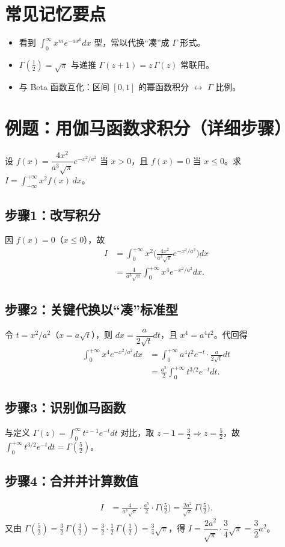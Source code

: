 \documentclass[UTF8,a4paper,12pt]{ctexart}
\numberwithin{equation}{section}
\begin{document}
\section{常见记忆要点}
\begin{itemize}
  \item 看到 \(\int_0^{\infty} x^m e^{-a x^k} dx\) 型，常以代换“凑”成 \(\Gamma\) 形式。
  \item \(\Gamma(\tfrac{1}{2}) = \sqrt{\pi}\) 与递推 \(\Gamma(z+1) = z\,\Gamma(z)\) 常联用。
  \item 与 Beta 函数互化：区间 \([0,1]\) 的幂函数积分 \(\leftrightarrow\) \(\Gamma\) 比例。
\end{itemize}

\section{例题：用伽马函数求积分（详细步骤）}
设 \(f(x) = \dfrac{4x^2}{a^3\sqrt{\pi}} e^{-x^2/a^2}\) 当 \(x>0\)，且 \(f(x)=0\) 当 \(x\le 0\)。求 \(I = \int_{-\infty}^{+\infty} x^2 f(x)\,dx\)。
\subsection*{步骤1：改写积分}
因 \(f(x)=0\)（\(x\le 0\)），故
\begin{align}
I &= \int_0^{+\infty} x^2\Big(\frac{4x^2}{a^3\sqrt{\pi}} e^{-x^2/a^2}\Big) dx\\
  &= \frac{4}{a^3\sqrt{\pi}} \int_0^{+\infty} x^4 e^{-x^2/a^2} dx.
\end{align}
\subsection*{步骤2：关键代换以“凑”标准型}
令 \(t = x^2/a^2\)（\(x = a\sqrt{t}\)），则 \(dx = \dfrac{a}{2\sqrt{t}} dt\)，且 \(x^4 = a^4 t^2\)。代回得
\begin{align}
\int_0^{+\infty} x^4 e^{-x^2/a^2} dx
&= \int_0^{+\infty} a^4 t^2 e^{-t} \cdot \frac{a}{2\sqrt{t}} dt\\
&= \frac{a^5}{2} \int_0^{+\infty} t^{3/2} e^{-t} dt.
\end{align}
\subsection*{步骤3：识别伽马函数}
与定义 \(\Gamma(z) = \int_0^{\infty} t^{z-1} e^{-t} dt\) 对比，取 \(z-1=\tfrac{3}{2}\Rightarrow z=\tfrac{5}{2}\)，故
\(\int_0^{+\infty} t^{3/2} e^{-t} dt = \Gamma(\tfrac{5}{2})\)。
\subsection*{步骤4：合并并计算数值}
\begin{align}
I &= \frac{4}{a^3\sqrt{\pi}} \cdot \frac{a^5}{2} \cdot \Gamma\!\Big(\tfrac{5}{2}\Big)
= \frac{2a^2}{\sqrt{\pi}}\,\Gamma\!\Big(\tfrac{5}{2}\Big).
\end{align}
又由 \(\Gamma(\tfrac{5}{2}) = \tfrac{3}{2}\,\Gamma(\tfrac{3}{2}) = \tfrac{3}{2}\cdot\tfrac{1}{2}\,\Gamma(\tfrac{1}{2}) = \tfrac{3}{4}\sqrt{\pi}\)，得
\(I = \dfrac{2a^2}{\sqrt{\pi}}\cdot \dfrac{3}{4}\sqrt{\pi} = \dfrac{3}{2}a^2\)。
\end{document}
